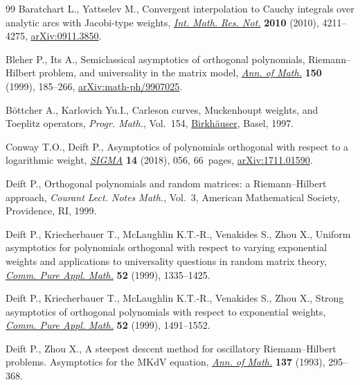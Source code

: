 \documentclass[11pt]{article}
\numberwithin{equation}{section}
\numberwithin{equation}{section}
\begin{document}
\begin{thebibliography}{99}
Baratchart L., Yattselev M., Convergent interpolation to {C}auchy integrals
 over analytic arcs with {J}acobi-type weights, \href{https://doi.org/10.1093/imrn/rnq026}{\textit{Int. Math. Res. Not.}}
 \textbf{2010} (2010), 4211--4275, \href{https://arxiv.org/abs/0911.3850}{arXiv:0911.3850}.

Bleher P., Its A., Semiclassical asymptotics of orthogonal polynomials,
 {R}iemann--{H}ilbert problem, and universality in the matrix model,
 \href{https://doi.org/10.2307/121101}{\textit{Ann. of Math.}} \textbf{150} (1999), 185--266,
 \href{https://arxiv.org/abs/math-ph/9907025}{arXiv:math-ph/9907025}.

B\"ottcher A., Karlovich Yu.I., Carleson curves, {M}uckenhoupt weights, and
 {T}oeplitz operators, \textit{Progr. Math.}, Vol.~154, \href{https://doi.org/10.1007/978-3-0348-8922-3}{Birkh\"auser}, Basel,
 1997.

Conway T.O., Deift P., Asymptotics of polynomials orthogonal with respect to a
 logarithmic weight, \href{https://doi.org/10.3842/SIGMA.2018.056}{\textit{SIGMA}} \textbf{14} (2018), 056, 66~pages,
 \href{https://arxiv.org/abs/1711.01590}{arXiv:1711.01590}.

Deift P., Orthogonal polynomials and random matrices: a {R}iemann--{H}ilbert
 approach, \textit{Courant Lect. Notes Math.}, Vol.~3, American Mathematical
 Society, Providence, RI, 1999.

Deift P., Kriecherbauer T., McLaughlin K.T.-R., Venakides S., Zhou X., Uniform
 asymptotics for polynomials orthogonal with respect to varying exponential
 weights and applications to universality questions in random matrix theory,
 \href{https://doi.org/10.1002/(SICI)1097-0312(199911)52:11&lt;1335::AID-CPA1&gt;3.0.CO;2-1}{\textit{Comm. Pure Appl. Math.}} \textbf{52} (1999), 1335--1425.

Deift P., Kriecherbauer T., McLaughlin K.T.-R., Venakides S., Zhou X., Strong
 asymptotics of orthogonal polynomials with respect to exponential weights,
 \href{https://doi.org/10.1002/(SICI)1097-0312(199912)52:12&lt;1491::AID-CPA2&gt;3.3.CO;2-R}{\textit{Comm. Pure Appl. Math.}} \textbf{52} (1999), 1491--1552.

Deift P., Zhou X., A steepest descent method for oscillatory
 {R}iemann--{H}ilbert problems. {A}symptotics for the {MK}d{V} equation,
 \href{https://doi.org/10.2307/2946540}{\textit{Ann. of Math.}} \textbf{137} (1993), 295--368.


\end{thebibliography}
\end{document}
